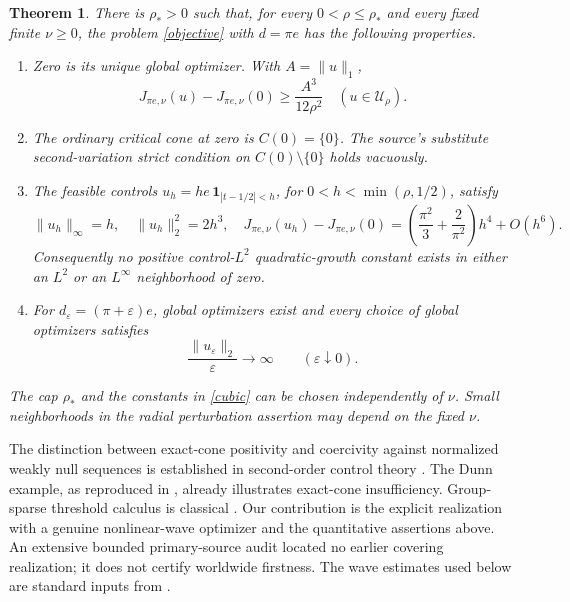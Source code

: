 \documentclass[11pt]{article}
\newtheorem{theorem}{Theorem}
\newcommand{\U}{\mathcal U_\rho}
\newcommand{\norm}[1]{\lVert #1\rVert}
\begin{document}
\begin{theorem}\label{main}
There is $\rho_*>0$ such that, for every $0<\rho\le\rho_*$ and every fixed
finite $\nu\ge0$, the problem \eqref{objective} with $d=\pi e$ has the
following properties.
\begin{enumerate}
\item Zero is its unique global optimizer. With $A=\norm u_1$,
\begin{equation}\label{cubic}
 J_{\pi e,\nu}(u)-J_{\pi e,\nu}(0)\ge\frac{A^3}{12\rho^2}
 \quad (u\in\U).
\end{equation}
\item The ordinary critical cone at zero is $C(0)=\{0\}$. The source's
substitute second-variation strict condition on $C(0)\setminus\{0\}$ holds
vacuously.
\item The feasible controls $u_h=h e\,\mathbf1_{|t-1/2|<h}$, for
$0<h<\min(\rho,1/2)$, satisfy
\begin{equation}\label{pulseclaim}
 \norm{u_h}_\infty=h,\quad \norm{u_h}_2^2=2h^3,\quad
 J_{\pi e,\nu}(u_h)-J_{\pi e,\nu}(0)
  =\left(\frac{\pi^2}{3}+\frac2{\pi^2}\right)h^4+O(h^6).
\end{equation}
Consequently no positive control-$L^2$ quadratic-growth constant exists
in either an $L^2$ or an $L^\infty$ neighborhood of zero.
\item For $d_\varepsilon=(\pi+\varepsilon)e$, global optimizers exist and
every choice of global optimizers satisfies
\begin{equation}\label{instability}
 \frac{\norm{u_\varepsilon}_2}{\varepsilon}\longrightarrow\infty
 \qquad(\varepsilon\downarrow0).
\end{equation}
\end{enumerate}
The cap $\rho_*$ and the constants in \eqref{cubic} can be chosen
independently of $\nu$. Small neighborhoods in the radial perturbation
assertion may depend on the fixed $\nu$.
\end{theorem}

The distinction between exact-cone positivity and coercivity against
normalized weakly null sequences is established in second-order control
theory \cite{CT12,CHW,CW,BW}. The Dunn example, as reproduced in
\cite[Example~4.16]{CT15}, already illustrates exact-cone insufficiency.
Group-sparse threshold calculus is classical \cite{HSW}. Our contribution
is the explicit realization with a genuine nonlinear-wave optimizer and
the quantitative assertions above. An extensive bounded primary-source
audit located no earlier covering realization; it does not certify
worldwide firstness. The wave estimates used below are standard
inputs from \cite{KM}.
\end{document}
